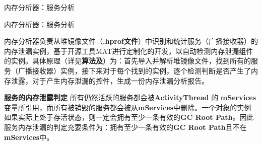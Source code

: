 \begin{algorithm}
	\caption{内存分析器：服务分析}
	\label{alg:memory analyser:service}
	\begin{algorithmic}[1]
					\ELSE
					\ENDIF
				\ENDIF
			\ENDIF
		\ENDFOR
	\end{algorithmic}
\end{algorithm}

\begin{algorithm}
	\caption{内存分析器：服务分析}
	\label{alg:memory analyser:receiver}
	\begin{algorithmic}[1]
					\ELSE
					\ENDIF
				\ENDIF
			\ENDIF
		\ENDFOR
	\end{algorithmic}
\end{algorithm}

内存分析器负责从堆镜像文件（\textbf{.hprof文件}）中识别和统计服务（广播接收器）的内存泄漏实例，基于开源工具MAT\cite{mat}进行定制化的开发，以自动检测内存泄漏组件的实例。具体原理（详见\textbf{算法\redbf{\ref{alg:memory analyser:service}}及\redbf{\ref{alg:memory analyser:receiver}}}）为：首先导入并解析堆镜像文件，找到所有的服务（广播接收器）实例，接下来对于每个找到的实例，逐个检测判断是否产生了内存泄露，对于产生内存泄漏的控件，生成一份内存泄漏分析报告。

\textbf{服务的内存泄露判定 } 所有仍然活跃的服务都会被\textbf{ActivityThread} 的 \textbf{mServices}变量所引用，而所有被销毁的服务都会被从\textbf{mServices}中删除。一个对象的实例如果实际上处于存活状态，则一定会拥有至少一条有效的\textbf{GC Root Path}。因此服务内存泄漏的判定充要条件为：拥有至少一条有效的\textbf{GC Root Path}且不在\textbf{mServices}中。

